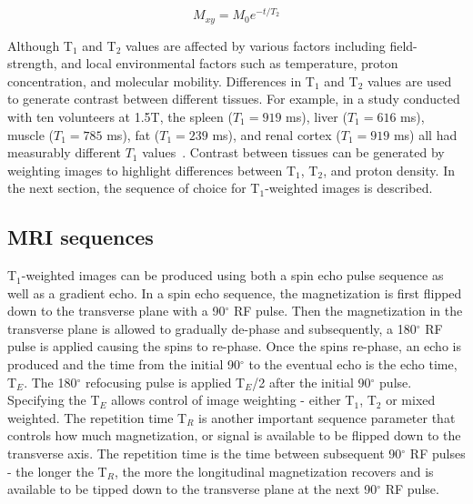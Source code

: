 \begin{equation}
		M_{xy} = M_0 e^{-t/T_2}
		\label{T2}
\end{equation}

Although T$_1$ and T$_2$ values are affected by various factors including field-strength, and local environmental factors such as temperature, proton concentration, and molecular mobility. 
Differences in T$_1$ and T$_2$ values are used to generate contrast between different tissues. 
For example, in a study conducted with ten volunteers at 1.5T, the spleen ($T_1 = 919$ ms), liver ($T_1 = 616$ ms), muscle ($T_1 = 785$ ms), fat ($T_1 = 239$ ms), and renal cortex ($T_1 = 919$ ms) all had measurably different $T_1$ values~\cite{OConnor:2009ku}.
Contrast between tissues can be generated by weighting images to highlight differences between T$_1$, T$_2$, and proton density.
In the next section, the sequence of choice for T$_1$-weighted images is described. 

\subsection{MRI sequences}

T$_1$-weighted images can be produced using both a spin echo pulse sequence as well as a gradient echo.
In a spin echo sequence, the magnetization is first flipped down to the transverse plane with a 90$^\circ$ RF pulse. 
Then the magnetization in the transverse plane is allowed to gradually de-phase and subsequently, a 180$^\circ$ RF pulse is applied causing the spins to re-phase.
Once the spins re-phase, an echo is produced and the time from the initial 90$^\circ$ to the eventual echo is the echo time, T$_E$. 
The 180$^\circ$ refocusing pulse is applied T$_E$/2 after the initial 90$^\circ$ pulse.
Specifying the T$_E$ allows control of image weighting - either T$_1$, T$_2$ or mixed weighted.
The repetition time T$_R$ is another important sequence parameter that controls how much magnetization, or signal is available to be flipped down to the transverse axis.
The repetition time is the time between subsequent 90$^\circ$ RF pulses - the longer the T$_R$, the more the longitudinal magnetization recovers and is available to be tipped down to the transverse plane at the next 90$^\circ$ RF pulse.

